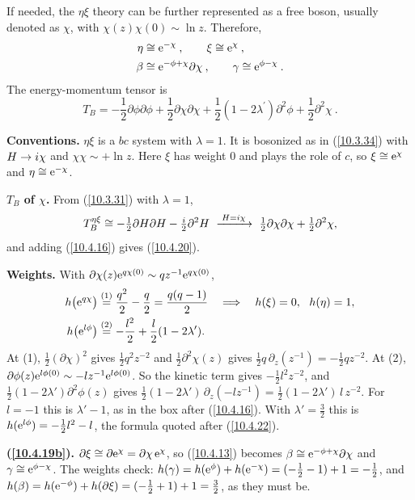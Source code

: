 	If needed, the $\eta\xi$ theory can be further represented as a free boson, usually denoted as $\chi$, with $\chi(z)\chi(0)\sim \ln z$. Therefore,
	\begin{subequations}
		\begin{align}
			\eta &\cong \mathrm{e}^{-\chi} \:, \qquad \xi \cong \mathrm{e}^{\chi} \:, \label{10.4.19a} \\
			\beta &\cong \mathrm{e}^{-\phi+\chi}\partial\chi\:, \qquad \gamma\cong \mathrm{e}^{\phi-\chi} \:. \label{10.4.19b}
		\end{align} \label{10.4.19}
	\end{subequations}
	The energy-momentum tensor is
	\begin{equation}
		T_{B} = -\frac{1}{2}\partial\phi \partial\phi +\frac{1}{2}\partial\chi\partial\chi 
		+\frac{1}{2}(1-2\lambda^{\prime})\partial^{2}\phi + \frac{1}{2} \partial^{2}\chi \:. \label{10.4.20}
	\end{equation}
	\begin{tcolorbox}[breakable]
		\begin{remark}
			\textbf{Conventions.} $\eta\xi$ is a $bc$ system with $\lambda=1$. It is bosonized as in (\ref{10.3.34}) with $H\to i\chi$ and $\chi\chi\sim+\ln z$. Here $\xi$ has weight $0$ and plays the role of $c$, so $\xi\cong\mathrm{e}^{\chi}$ and $\eta\cong\mathrm{e}^{-\chi}$.

			\textbf{$T_B$ of $\chi$.} From (\ref{10.3.31}) with $\lambda=1$,
			\begin{equation*}
				T^{\eta\xi}_B\cong-\tfrac12\partial H\partial H-\tfrac{\mi}{2}\partial^{2}H\ \xrightarrow{\;H=\mi\chi\;}\ \tfrac12\partial\chi\partial\chi+\tfrac12\partial^{2}\chi ,
			\end{equation*}
			and adding (\ref{10.4.16}) gives (\ref{10.4.20}).

			\textbf{Weights.} With $\partial\chi(z)\mathrm{e}^{q\chi(0)}\sim q z^{-1}\mathrm{e}^{q\chi(0)}$,
			\begin{align*}
				h\bigl(\mathrm{e}^{q\chi}\bigr)&\overset{(1)}{=}\frac{q^{2}}{2}-\frac{q}{2}=\frac{q(q-1)}{2}\quad\Longrightarrow\quad h(\xi)=0,\ \ h(\eta)=1,\\
				h\bigl(\mathrm{e}^{l\phi}\bigr)&\overset{(2)}{=}-\frac{l^{2}}{2}+\frac{l}{2}(1-2\lambda') .
			\end{align*}
			At (1), $\tfrac12(\partial\chi)^{2}$ gives $\tfrac12q^{2}z^{-2}$ and $\tfrac12\partial^{2}\chi(z)$ gives $\tfrac12q\,\partial_z(z^{-1})=-\tfrac12qz^{-2}$. At (2), $\partial\phi(z)\mathrm{e}^{l\phi(0)}\sim-lz^{-1}\mathrm{e}^{l\phi(0)}$. So the kinetic term gives $-\tfrac12l^{2}z^{-2}$, and $\tfrac12(1-2\lambda')\partial^{2}\phi(z)$ gives $\tfrac12(1-2\lambda')\,\partial_z(-lz^{-1})=\tfrac12(1-2\lambda')\,l\,z^{-2}$. For $l=-1$ this is $\lambda'-1$, as in the box after (\ref{10.4.16}). With $\lambda'=\tfrac32$ this is $h(\mathrm{e}^{l\phi})=-\tfrac12l^{2}-l$, the formula quoted after (\ref{10.4.22}).

			\textbf{(\ref{10.4.19b}).} $\partial\xi\cong\partial\mathrm{e}^{\chi}=\partial\chi\,\mathrm{e}^{\chi}$, so (\ref{10.4.13}) becomes $\beta\cong\mathrm{e}^{-\phi+\chi}\partial\chi$ and $\gamma\cong\mathrm{e}^{\phi-\chi}$. The weights check: $h(\gamma)=h(\mathrm{e}^{\phi})+h(\mathrm{e}^{-\chi})=(-\tfrac12-1)+1=-\tfrac12$, and $h(\beta)=h(\mathrm{e}^{-\phi})+h(\partial\xi)=(-\tfrac12+1)+1=\tfrac32$, as they must be.
		\end{remark}
	\end{tcolorbox}
